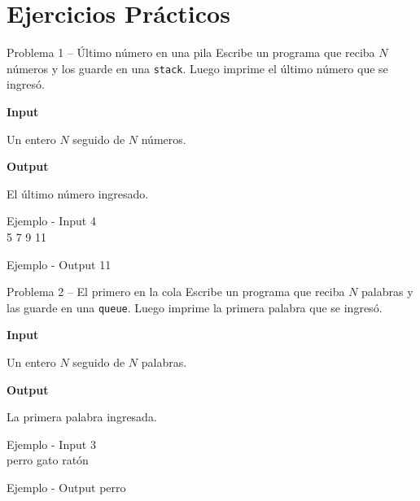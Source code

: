 \documentclass{article}
\begin{document}
\vspace{0.5cm}

\section{Ejercicios Prácticos}

\begin{container}{Problema 1 – Último número en una pila}
Escribe un programa que reciba $N$ números y los guarde en una \texttt{stack}. Luego imprime el último número que se ingresó.
\end{container}

\textbf{Input}

Un entero $N$ seguido de $N$ números.

\vspace{0.5em}
\textbf{Output}

El último número ingresado.

\vspace{0.5em}

\begin{container}{Ejemplo - Input}
4 \\
5 7 9 11
\end{container}

\begin{container}{Ejemplo - Output}
11
\end{container}

\vspace{3.5em}


\begin{container}{Problema 2 – El primero en la cola}
Escribe un programa que reciba $N$ palabras y las guarde en una \texttt{queue}. Luego imprime la primera palabra que se ingresó.
\end{container}

\textbf{Input}

Un entero $N$ seguido de $N$ palabras.

\vspace{0.5em}
\textbf{Output}

La primera palabra ingresada.

\vspace{0.5em}

\begin{container}{Ejemplo - Input}
3 \\
perro gato ratón
\end{container}

\begin{container}{Ejemplo - Output}
perro
\end{container}
\end{document}
